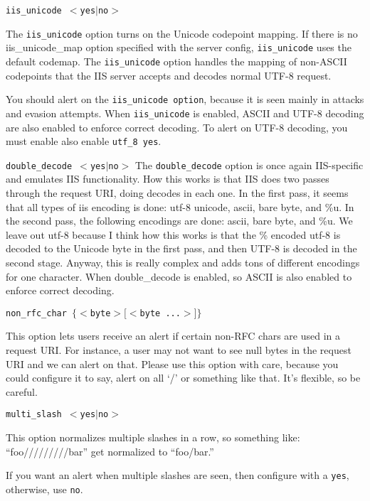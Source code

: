 \documentclass[english]{report}
\newcounter{slistnum}
\newenvironment{slist}
{ \begin{list}{ {\bf \arabic{slistnum}.} }{\usecounter{slistnum} } }
{ \end{list} }
\begin{document}
\begin{slist}
\item \texttt{iis\_unicode $<$yes$|$no$>$}

The \texttt{iis\_unicode} option turns on the Unicode codepoint mapping.  If there is no
iis\_unicode\_map option specified with the server config, \texttt{iis\_unicode} uses the
default codemap.  The \texttt{iis\_unicode} option handles the mapping of non-ASCII
codepoints that the IIS server accepts and decodes normal UTF-8 request.

You should alert on the \texttt{iis\_unicode option}, because it is seen mainly in
attacks and evasion attempts.  When \texttt{iis\_unicode} is enabled, ASCII and
UTF-8 decoding are also enabled to enforce correct decoding.  To alert on UTF-8 decoding, you
 must enable also enable \texttt{utf\_8 yes}. 

\item \texttt{double\_decode $<$yes$|$no$>$}
The \texttt{double\_decode} option is once again IIS-specific and emulates IIS
functionality.  How this works is that IIS does two passes through the request
URI, doing decodes in each one.  In the first pass, it seems that all types of
iis encoding is done: utf-8 unicode, ascii, bare byte, and \%u.  In the second
pass, the following encodings are done:  ascii, bare byte, and \%u.  We leave out
utf-8 because I think how this works is that the \% encoded utf-8 is decoded to
the Unicode byte in the first pass, and then UTF-8 is decoded in the second stage.
Anyway, this is really complex and adds tons of different encodings for one
character.  When double\_decode is enabled, so ASCII is also enabled to enforce correct decoding.

\item \texttt{non\_rfc\_char $\{ <$byte$> [<$byte ...$>] \}$}

This option lets users receive an alert if certain non-RFC chars are used in a
request URI.  For instance, a user may not want to see null bytes in the
request URI and we can alert on that.  Please use this option with
care, because you could configure it to say, alert on all `/' or something like
that.  It's flexible, so be careful.

\item \texttt{multi\_slash $<$yes$|$no$>$}

This option normalizes multiple slashes in a row, so something like:
``foo/////////bar'' get normalized to ``foo/bar.''

If you want an alert when multiple slashes are seen, then configure with a \texttt{yes},
otherwise, use \texttt{no}.


\end{slist}
\end{document}
